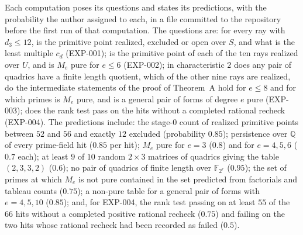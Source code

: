 \documentclass[11pt]{article}
\theoremstyle{definition}
\theoremstyle{remark}
\newcommand{\EXP}[1]{\mbox{EXP-#1}}
\newcommand{\Q}{\mathbb{Q}}
\newcommand{\F}{\mathbb{F}}
\begin{document}
Each computation poses its questions and states its predictions, with the probability the author assigned to each, in a file committed to the repository before the first run of that computation. The questions are: for every ray with $d_3\le12$, is the primitive point realized, excluded or open over $S$, and what is the least multiple $c_d$ (\EXP{001}); is the primitive point of each of the ten rays realized over $U$, and is $M_e$ pure for $e\le6$ (\EXP{002}); in characteristic $2$ does any pair of quadrics have a finite length quotient, which of the other nine rays are realized, do the intermediate statements of the proof of Theorem~A hold for $e\le8$ and for which primes is $M_e$ pure, and is a general pair of forms of degree $e$ pure (\EXP{003}); does the rank test pass on the hits without a completed rational recheck (\EXP{004}). The predictions include: the stage-0 count of realized primitive points between $52$ and $56$ and exactly $12$ excluded (probability $0.85$); persistence over $\Q$ of every prime-field hit ($0.85$ per hit); $M_e$ pure for $e=3$ ($0.8$) and for $e=4,5,6$ ($0.7$ each); at least $9$ of $10$ random $2\times3$ matrices of quadrics giving the table $(2,3,3,2)$ ($0.6$); no pair of quadrics of finite length over $\F_{2^r}$ ($0.95$); the set of primes at which $M_e$ is not pure contained in the set predicted from factorials and tableau counts ($0.75$); a non-pure table for a general pair of forms with $e=4,5,10$ ($0.85$); and, for \EXP{004}, the rank test passing on at least $55$ of the $66$ hits without a completed positive rational recheck ($0.75$) and failing on the two hits whose rational recheck had been recorded as failed ($0.5$).
\end{document}
